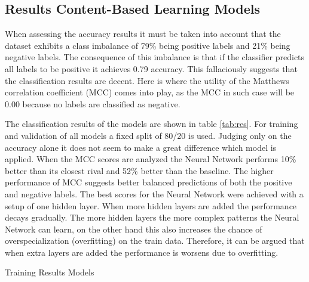 % 

\subsection{Results Content-Based Learning Models}
When assessing the accuracy results it must be taken into account that the dataset exhibits a class imbalance of 79\% being positive labels and 21\% being negative labels. 
The consequence of this imbalance is that if the classifier predicts all labels to be positive it achieves 0.79 accuracy. 
This fallaciously suggests that the classification results are decent.
Here is where the utility of the Matthews correlation coefficient (MCC) comes into play, as the MCC in such case will be 0.00 because no labels are classified as negative. 

The classification results of the models are shown in table \ref{tab:res}.
For training and validation of all models a fixed split of 80/20 is used.
Judging only on the accuracy alone it does not seem to make a great difference which model is applied.
When the MCC scores are analyzed the Neural Network performs 10\% better than its closest rival and 52\% better than the baseline. 
The higher performance of MCC suggests better balanced predictions of both the positive and negative labels.
The best scores for the Neural Network were achieved with a setup of one hidden layer. 
When more hidden layers are added the performance decays gradually.
The more hidden layers the more complex patterns the Neural Network can learn, on the other hand this also increases the chance of overspecialization (overfitting) on the train data. 
Therefore, it can be argued that when extra layers are added the performance is worsens due to overfitting. 

\begin{table}[h]
\begin{footnotesize}

\end{footnotesize}
\caption{\label{tab:res} Training Results Models}
\end{table}

